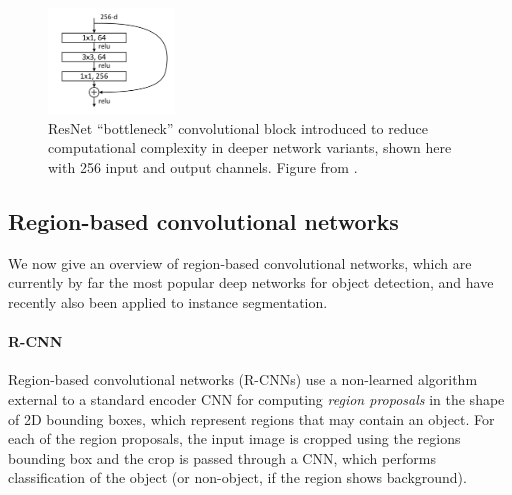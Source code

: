 \begin{figure}[t]
  \centering
  \includegraphics[width=0.3\textwidth]{figures/bottleneck}
\caption{
ResNet \cite{ResNet} \enquote{bottleneck} convolutional block introduced to reduce computational
complexity in deeper network variants, shown here with 256 input and output channels.
Figure from \cite{ResNet}.
}
\label{figure:bottleneck}
\end{figure}

\subsection{Region-based convolutional networks}
\label{ssec:rcnn}
We now give an overview of region-based convolutional networks, which are currently by far the
most popular deep networks for object detection, and have recently also been applied to instance segmentation.

\paragraph{R-CNN}
Region-based convolutional networks (R-CNNs) \cite{RCNN} use a non-learned algorithm external to a standard encoder CNN
for computing \emph{region proposals} in the shape of 2D bounding boxes, which represent regions that may contain an object.
For each of the region proposals, the input image is cropped using the regions bounding box and the crop is
passed through a CNN, which performs classification of the object (or non-object, if the region shows background).

